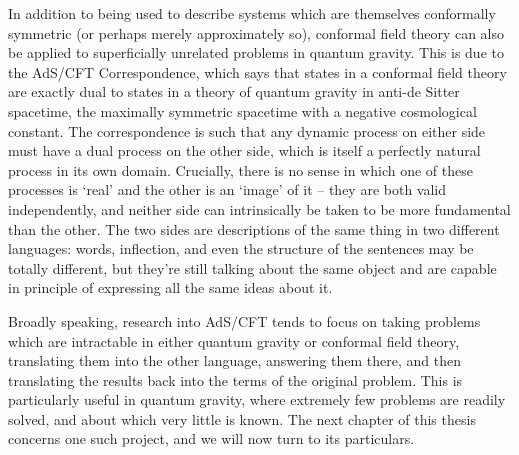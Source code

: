 In addition to being used to describe systems which are themselves conformally
symmetric (or perhaps merely approximately so), conformal field theory can also
be applied to superficially unrelated problems in quantum gravity. This is due
to the AdS/CFT Correspondence, which says that states in a conformal field
theory are exactly dual to states in a theory of quantum gravity in anti-de 
Sitter spacetime, the maximally symmetric spacetime with a negative cosmological
constant. The correspondence is such that any dynamic process on either side 
must have a dual process on the other side, which is itself a perfectly natural 
process in its own domain. Crucially, there is no sense in which one of these 
processes is `real' and the other is an `image' of it -- they are both valid 
independently, and neither side can intrinsically be taken to be more 
fundamental than the other. The two sides are descriptions of the same thing in
two different languages: words, inflection, and even the structure of the 
sentences may be totally different, but they're still talking about the same
object and are capable in principle of expressing all the same ideas about it.

Broadly speaking, research into AdS/CFT tends to focus on taking problems which 
are intractable in either quantum gravity or conformal field theory, translating 
them into the other language, answering them there, and then translating the
results back into the terms of the original problem. This is particularly useful
in quantum gravity, where extremely few problems are readily solved, and about
which very little is known. The next chapter of this thesis concerns one such
project, and we will now turn to its particulars.

